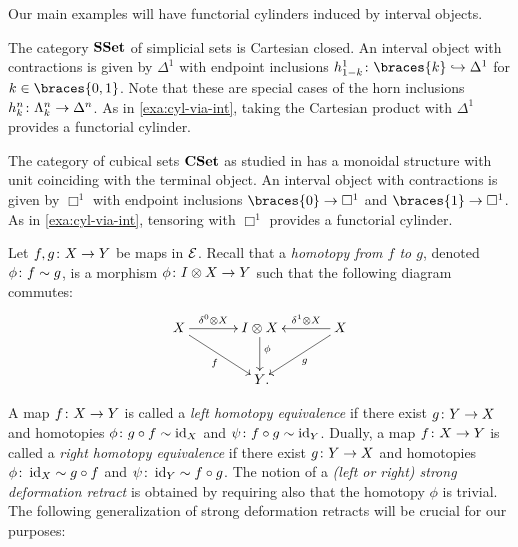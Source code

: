 \documentclass[reqno,10pt,a4paper,oneside]{amsart}
\begin{document}
Our main examples will have functorial cylinders induced by interval objects.

\begin{example} \label{exa:cyl-in-sset}
The category $\mathbf{SSet}$ of simplicial sets is Cartesian closed.
An interval object with contractions is given by $\Delta^1$ with endpoint inclusions $h_{1-k}^1 \co \braces{k} \hookrightarrow \Delta^1$ for $k \in \braces{ 0, 1 }$.
Note that these are special cases of the horn inclusions $h_k^n \colon \Lambda_k^n \to \Delta^n$.
As in \cref{exa:cyl-via-int}, taking the Cartesian product with $\Delta^1$ provides a functorial cylinder.
\end{example}

\begin{example} \label{exa:cyl-in-cuset}
The category of cubical sets $\mathbf{CSet}$ as studied in \cite{coquand-variation} has a monoidal structure with unit coinciding with the terminal object.
An interval object with contractions is given by $\Box^1$ with endpoint inclusions $\braces{0} \to \Box^1$ and $\braces{1} \to \Box^1$.
As in \cref{exa:cyl-via-int}, tensoring with $\Box^1$ provides a functorial cylinder.
\end{example}

Let $f, g \colon X \to Y$ be maps in $\mathcal{E}$.
Recall that a \emph{homotopy from $f$ to $g$}, denoted $\phi \colon f \sim g$, is a morphism $\phi \colon I \otimes X \to Y$ such that the following diagram commutes:
\begin{equation}
\label{equ:homotopy}
\begin{gathered}
\xymatrix@C=1.2cm{
  X
  \ar[r]^-{\lcyl \otimes X}
  \ar[dr]_{f}
&
  \interval \otimes X
  \ar[d]^(0.4){\phi}
&
  X
  \ar[dl]^{g}
  \ar[l]_-{\rcyl \otimes X}
\\&
  Y
\rlap{.}}
\end{gathered}
\end{equation}

A map $f \colon X \to Y$ is called a \emph{left homotopy equivalence} if there exist $g \colon Y \to X$ and homotopies $\phi \colon g \mathbin{\circ} f \sim \operatorname{id}_X $ and $\psi \colon f \mathbin{\circ} g \sim \operatorname{id}_Y$.
Dually, a map $f \colon X \to Y$ is called a \emph{right homotopy equivalence} if there exist $g \colon Y \to X$ and homotopies $\phi \colon \operatorname{id}_X \sim g \mathbin{\circ} f$ and $\psi \colon \operatorname{id}_Y \sim f \mathbin{\circ} g$.
The notion of a \emph{(left or right) strong deformation retract} is obtained by requiring also that the homotopy $\phi$ is trivial.
The following generalization of strong deformation retracts will be crucial for our purposes:
\end{document}
